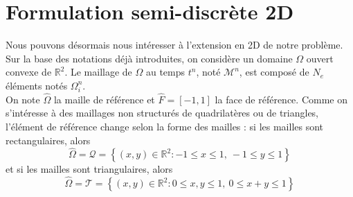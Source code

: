 \documentclass[11pt, a4paper, oneside]{report}
\begin{document}
\section{Formulation semi-discrète 2D}

Nous pouvons désormais nous intéresser à l'extension en 2D de notre problème. \\
Sur la base des notations déjà introduites, on considère un domaine $\Omega$ ouvert convexe de $\mathbb{R}^2$. Le maillage de $\Omega$ au temps $t^n$, noté $\mathcal{M}^n$, est composé de $N_e$ éléments notés $\Omega_i^n$. \\
On note $\widehat{\Omega}$ la maille de référence et $\widehat{F} = [-1, 1]$ la face de référence. Comme on s'intéresse à des maillages non structurés de quadrilatères ou de triangles, l'élément de référence change selon la forme des mailles : si les mailles sont rectangulaires, alors
\begin{equation}
    \widehat{\Omega} = \mathcal{Q} = \left\{ (x, y) \in \mathbb{R}^2 : -1 \leq x \leq 1, ~ -1 \leq y \leq 1 \right\}
\end{equation}
et si les mailles sont triangulaires, alors
\begin{equation}
    \widehat{\Omega} = \mathcal{T} = \left\{ (x, y) \in \mathbb{R}^2 : 0 \leq x, y \leq 1, ~ 0 \leq x + y \leq 1 \right\}
\end{equation}
\end{document}
